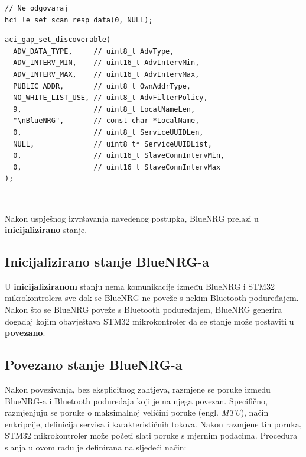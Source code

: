 \documentclass[times, utf8, diplomski]{diplomski}
\begin{document}
\begin{lstlisting}[caption={Postavi odgovor na poruku otkrivanja (engl. \textit{discover message})}]
// Ne odgovaraj
hci_le_set_scan_resp_data(0, NULL);
\end{lstlisting}

\begin{lstlisting}[caption={Postavi stanje BlueNRG-a u stanje u povezivo stanje}, label={lastinit}]
aci_gap_set_discoverable(
  ADV_DATA_TYPE,     // uint8_t AdvType,
  ADV_INTERV_MIN,    // uint16_t AdvIntervMin,
  ADV_INTERV_MAX,    // uint16_t AdvIntervMax,
  PUBLIC_ADDR,       // uint8_t OwnAddrType,
  NO_WHITE_LIST_USE, // uint8_t AdvFilterPolicy,
  9,                 // uint8_t LocalNameLen,
  "\nBlueNRG",       // const char *LocalName,
  0,                 // uint8_t ServiceUUIDLen,
  NULL,              // uint8_t* ServiceUUIDList,
  0,                 // uint16_t SlaveConnIntervMin,
  0,                 // uint16_t SlaveConnIntervMax
);
\end{lstlisting}
\ \

Nakon uspješnog izvršavanja navedenog postupka, BlueNRG prelazi u \textbf{inicijalizirano} stanje.

\subsection{Inicijalizirano stanje BlueNRG-a}
U \textbf{inicijaliziranom} stanju nema komunikacije između BlueNRG i STM32 mikrokontrolera sve dok se BlueNRG ne poveže s nekim Bluetooth poduređajem. Nakon što se BlueNRG poveže s Bluetooth poduređajem, BlueNRG generira događaj kojim obavještava STM32 mikrokontroler da se stanje može postaviti u \textbf{povezano}.

\subsection{Povezano stanje BlueNRG-a}
Nakon povezivanja, bez eksplicitnog zahtjeva, razmjene se poruke između BlueNRG-a i Bluetooth poduređaja koji je na njega povezan. Specifično, razmjenjuju se poruke o maksimalnoj veličini poruke (engl. \textit{MTU}), način enkripcije, definicija servisa i karakterističnih tokova. Nakon razmjene tih poruka, STM32 mikrokontroler može početi slati poruke s mjernim podacima. Procedura slanja u ovom radu je definirana na sljedeći način:
\end{document}

